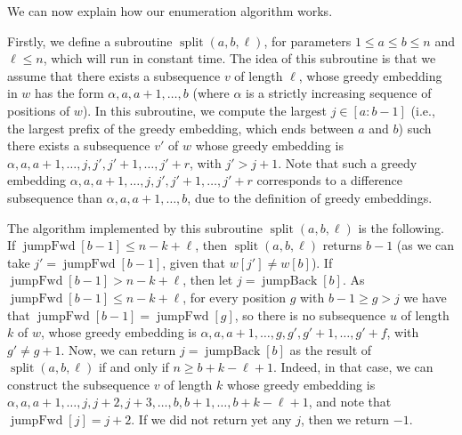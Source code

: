 \documentclass[10pt,a4paper]{amsart}
\makeatletter
\DeclareMathOperator{\splitt}{split}
\DeclareMathOperator{\jumpAhead}{{jumpFwd}}
\DeclareMathOperator{\jumpBack}{{jumpBack}}
\theoremstyle{plain}
\theoremstyle{definition}
\renewenvironment{proof}[1][\proofname]{\par
  \pushQED{}%
  \normalfont \topsep6\p@\@plus6\p@\relax
  \trivlist
  \item[\hskip\labelsep\itshape #1\@addpunct{.}]\ignorespaces
}{%
  \popQED\endtrivlist\@endpefalse
}
\makeatother
\begin{document}
\begin{proof}
We can now explain how our enumeration algorithm works.  

Firstly, we define a subroutine $\splitt(a,b,\ell)$, for parameters $1\leq a\leq b\leq n$ and $\ell\leq n$, which will run in constant time. The idea of this subroutine is that we assume that there exists a subsequence $v$ of length $\ell$, whose greedy embedding in $w$ has the form $\alpha, a,a+1,\ldots,b$ (where $\alpha$ is a strictly increasing sequence of positions of $w$). In this subroutine, we compute the largest $j\in [a:b-1]$ (i.e., the largest prefix of the greedy embedding, which ends between $a$ and $b$) such there exists a subsequence $v'$ of $w$ whose greedy embedding is $\alpha, a, a+1, \ldots, j, j', j'+1, \ldots, j'+r$, with $j'> j+1$. Note that such a greedy embedding  $\alpha, a, a+1, \ldots, j, j', j'+1, \ldots, j'+r$ corresponds to a difference subsequence than $\alpha, a,a+1,\ldots,b$, due to the definition of greedy embeddings. 

The algorithm implemented by this subroutine $\splitt(a,b,\ell)$ is the following. If $\jumpAhead[b-1]\leq n- k+\ell$, then $\splitt(a,b,\ell)$ returns $b-1$ (as we can take $j'=\jumpAhead[b-1]$, given that $w[j']\neq w[b]$).  If $\jumpAhead[b-1]> n- k+\ell$, then let $j=\jumpBack[b]$. As  $\jumpAhead[b-1]\leq n- k+\ell$, for every position $g$ with $b-1\geq g>j$ we have that $\jumpAhead[b-1]=\jumpAhead[g]$, so there is no subsequence $u$ of length $k$ of $w$, whose greedy embedding is $\alpha, a, a+1, \ldots, g, g', g'+1, \ldots, g'+f$, with $g'\neq g+1$. Now, we can return $j=\jumpBack[b]$ as the result of $\splitt(a,b,\ell)$ if and only if $n\geq b+k-\ell+1$. Indeed, in that case, we can construct the subsequence $v$ of length $k$ whose greedy embedding is $\alpha, a, a+1, \ldots, j, j+2, j+3, \ldots,  b, b+1, \ldots, b+k-\ell+1 $, and note that $\jumpAhead[j]=j+2$. If we did not return yet any $j$, then we return $-1$.


\end{proof}
\end{document}
